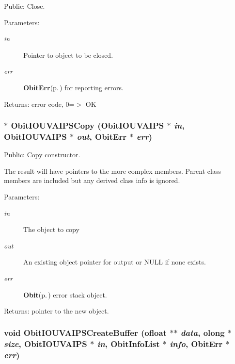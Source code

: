 Public: Close. 

\begin{Desc}
\item[Parameters:]
\begin{description}
\item[{\em in}]Pointer to object to be closed. \item[{\em err}]{\bf Obit\-Err}{\rm (p.\,\pageref{structObitErr})} for reporting errors. \end{description}
\end{Desc}
\begin{Desc}
\item[Returns:]error code, 0=$>$ OK \end{Desc}
\subsubsection{$\ast$ Obit\-IOUVAIPSCopy ({\bf Obit\-IOUVAIPS} $\ast$ {\em in}, {\bf Obit\-IOUVAIPS} $\ast$ {\em out}, {\bf Obit\-Err} $\ast$ {\em err})}\label{ObitIOUVAIPS_8h_a9}


Public: Copy constructor. 

The result will have pointers to the more complex members. Parent class members are included but any derived class info is ignored. \begin{Desc}
\item[Parameters:]
\begin{description}
\item[{\em in}]The object to copy \item[{\em out}]An existing object pointer for output or NULL if none exists. \item[{\em err}]{\bf Obit}{\rm (p.\,\pageref{structObit})} error stack object. \end{description}
\end{Desc}
\begin{Desc}
\item[Returns:]pointer to the new object. \end{Desc}
\subsubsection{\setlength{\rightskip}{0pt plus 5cm}void Obit\-IOUVAIPSCreate\-Buffer ({\bf ofloat} $\ast$$\ast$ {\em data}, {\bf olong} $\ast$ {\em size}, {\bf Obit\-IOUVAIPS} $\ast$ {\em in}, {\bf Obit\-Info\-List} $\ast$ {\em info}, {\bf Obit\-Err} $\ast$ {\em err})}\label{ObitIOUVAIPS_8h_a23}


